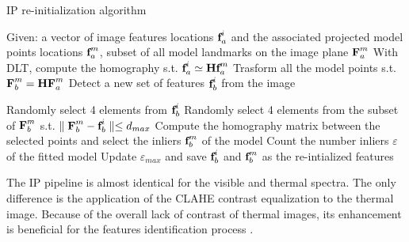 \begin{algorithm}
\caption{IP re-initialization algorithm}\label{alg:IP}
\begin{algorithmic}[1]
\State Given: a vector of image features locations $\mathrm{\textbf{f}}_a^i$ and the associated projected model points locations $\mathrm{\textbf{f}}_a^m$, subset of all model landmarks on the image plane $\mathrm{\textbf{F}}_a^m$
\State With DLT, compute the homography s.t. $\mathrm{\textbf{f}}_a^i \simeq \mathrm{\textbf{H}}\mathrm{\textbf{f}}_a^m$
\State Trasform all the model points s.t. $\mathrm{\textbf{F}}_b^m = \mathrm{\textbf{H}}\mathrm{\textbf{F}}_a^m$ 
\State Detect a new set of features $\mathrm{\textbf{f}}_b^i$ from the image 

    \State Randomly select 4 elements from $\mathrm{\textbf{f}}_b^i$
    \State Randomly select 4 elements from the subset of  $\mathrm{\textbf{F}}_b^m$ s.t. $\parallel \mathrm{\textbf{F}}_b^m - \mathrm{\textbf{f}}_b^i \parallel \leq d_{max}$
    \State Compute the homography matrix between the selected points and select the inliers \quad $\mathrm{\textbf{f}}_b^m$ of the model 
    \State Count the number inliers $\varepsilon$ of the fitted model 
    \State Update $\varepsilon_{max}$ and save $\mathrm{\textbf{f}}_b^i$ and $\mathrm{\textbf{f}}_b^m$ as the re-intialized features
    \EndIf
\EndWhile
\end{algorithmic}
\end{algorithm}

The IP pipeline is almost identical for the visible and thermal spectra. The only difference is the application of the CLAHE contrast equalization to the thermal image. Because of the overall lack of contrast of thermal images, its enhancement is beneficial for the features identification process \cite{rondao2020benchmarking}. 



